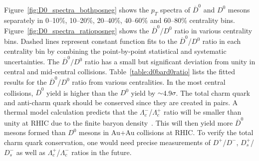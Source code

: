 \documentclass[%
 reprint,	
 amsmath,amssymb,
 aps,
 prc,
]{revtex4-1}
\begin{document}
Figure~\ref{fig:D0_spectra_bothposneg} shows the $p_{T}$ spectra of $\overline{D}^{0}$ and $D^0$ mesons separately in 0--10\%, 10--20\%, 20--40\%, 40--60\% and 60--80\% centrality bins. Figure~\ref{fig:D0_spectra_ratioposneg} shows the $\overline{D}^{0}$/$D^{0}$ ratio in various centrality bins. Dashed lines represent constant function fits to the $\overline{D}^{0}$/$D^{0}$ ratio in each centrality bin by combining the point-by-point statistical and systematic uncertainties. The $\overline{D}^0/D^0$ ratio has a small but significant deviation from unity in central and mid-central collisions. Table~\ref{table:d0bard0ratio} lists the fitted results for the $\overline{D}^{0}$/$D^0$ ratio from various centralities. In the most central collisions, $\overline{D}^{0}$ yield is higher than the $D^0$ yield by $\sim$4.9$\sigma$. The total charm quark and anti-charm quark should be conserved since they are created in pairs. A thermal model calculation predicts that the $\Lambda_{c}^-$/$\Lambda_{c}^+$ ratio will be smaller than unity at RHIC due to the finite baryon density~\cite{ANDRONIC200336}. This will then yield more 
$\overline{D}^{0}$ mesons formed than $D^0$ mesons in Au+Au collisions at RHIC. To verify the total charm quark conservation, one would need precise measurements of $D^{+}$/$D^{-}$, $D_{s}^{+}$/$D_{s}^{-}$ as well as $\Lambda_{c}^+$/$\Lambda_{c}^-$ ratios in the future.

\begin{table}[t]
\end{table}
\end{document}
